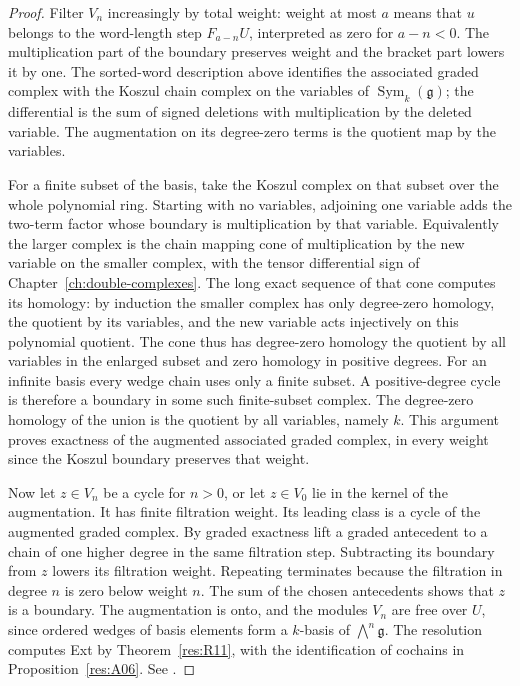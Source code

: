 \begin{proof}
Filter \(V_n\) increasingly by total weight: weight at most \(a\)
means that \(u\) belongs to the word-length step \(F_{a-n}U\),
interpreted as zero for \(a-n<0\). The multiplication part of the
boundary preserves weight and the bracket part lowers it by one.
The sorted-word description above identifies the associated graded
complex with the Koszul chain complex on the variables of
\(\operatorname{Sym}_k(\mathfrak g)\); the differential is the sum
of signed deletions with multiplication by the deleted variable.
The augmentation on its degree-zero terms is the quotient map
by the variables.

For a finite subset of the basis, take the Koszul complex on that
subset over the whole polynomial ring. Starting with no variables,
adjoining one variable adds the two-term factor whose boundary
is multiplication by that variable. Equivalently the larger complex
is the chain mapping cone of multiplication by the new variable
on the smaller complex, with the tensor differential sign of
Chapter~\ref{ch:double-complexes}. The long exact sequence of that
cone computes its homology: by induction the smaller complex has
only degree-zero homology, the quotient by its variables, and
the new variable acts injectively on this polynomial quotient.
The cone thus has degree-zero homology the quotient by all variables
in the enlarged subset and zero homology in positive degrees.
For an infinite basis every wedge chain uses only a finite subset.
A positive-degree cycle is therefore a boundary in some such
finite-subset complex. The degree-zero homology of the union is
the quotient by all variables, namely \(k\). This argument proves
exactness of the augmented associated graded complex, in every
weight since the Koszul boundary preserves that weight.

Now let \(z\in V_n\) be a cycle for \(n>0\), or let \(z\in V_0\)
lie in the kernel of the augmentation. It has finite filtration
weight. Its leading class is a cycle of the augmented graded
complex. By graded exactness lift a graded antecedent to a
chain of one higher degree in the same filtration step. Subtracting
its boundary from \(z\) lowers its filtration weight. Repeating
terminates because the filtration in degree \(n\) is zero below
weight \(n\). The sum of the chosen antecedents shows that \(z\)
is a boundary. The augmentation is onto, and the modules \(V_n\)
are free over \(U\), since ordered wedges of basis elements form
a \(k\)-basis of \(\bigwedge^n\mathfrak g\).
The resolution computes Ext by Theorem~\ref{res:R11}, with the
identification of cochains in Proposition~\ref{res:A06}.
See \cite[Theorem 7.7.2 and Corollary 7.7.3]{weibel}.
\end{proof}

